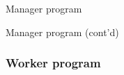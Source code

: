 \begin{frame}[containsverbatim]{Manager program}
\footnotesize
{}
\end{frame}

\begin{frame}[containsverbatim]{Manager program (cont'd)}
\footnotesize
{}
\end{frame}

\begin{frame}[containsverbatim]\frametitle{Worker program}
\end{frame}

\endinput

\begin{frame}[containsverbatim]\frametitle{}
\begin{lstlisting}
\end{lstlisting}
\end{frame}

